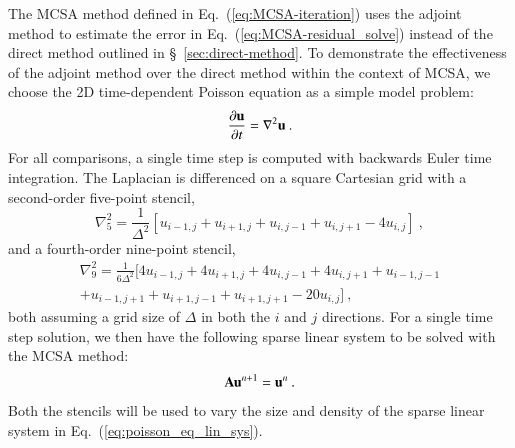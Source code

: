 \documentclass[preprint,12pt]{elsarticle}
\newcommand{\vA}{\ensuremath{\ve{A}}}
\newcommand{\vu}{\ensuremath{\ve{u}}}
\begin{document}
The MCSA method defined in Eq.~(\ref{eq:MCSA-iteration}) uses the adjoint
method to estimate the error in Eq.~(\ref{eq:MCSA-residual_solve}) instead of
the direct method outlined in \S~\ref{sec:direct-method}. To demonstrate the
effectiveness of the adjoint method over the direct method within the context
of MCSA, we choose the 2D time-dependent Poisson equation as a
simple model problem:
\begin{equation}
  \frac{\partial \vu}{\partial t} = \nabla^2 \vu\:.
  \label{eq:poisson_equation}
\end{equation}
For all comparisons, a single time step is computed with backwards Euler time
integration. The Laplacian is differenced on a square Cartesian grid with a
second-order five-point stencil,
\begin{equation}
  \nabla^2_5 = \frac{1}{\Delta^2}[u_{i-1,j} + u_{i+1,j} + u_{i,j-1} +
    u_{i,j+1} - 4 u_{i,j}]\:,
  \label{eq:five_point_stencil}
\end{equation}
and a fourth-order nine-point stencil,
\begin{multline}
  \nabla^2_9 = \frac{1}{6\Delta^2}[4 u_{i-1,j} + 4 u_{i+1,j} + 4
    u_{i,j-1} + 4 u_{i,j+1} + u_{i-1,j-1}\\ + u_{i-1,j+1} +
    u_{i+1,j-1} + u_{i+1,j+1} - 20 u_{i,j}]\:,
  \label{eq:nine_point_stencil}
\end{multline}
both assuming a grid size of $\Delta$ in both the $i$ and $j$ directions. For
a single time step solution, we then have the following sparse linear system
to be solved with the MCSA method:
\begin{equation}
  \vA \vu^{n+1} = \vu^n\:.
  \label{eq:poisson_eq_lin_sys}
\end{equation}
Both the stencils will be used to vary the size and density of the sparse
linear system in Eq.~(\ref{eq:poisson_eq_lin_sys}).
\end{document}
